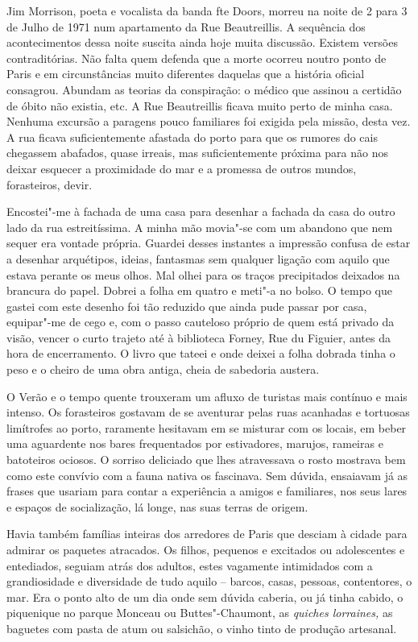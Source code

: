 Jim Morrison, poeta e vocalista da banda fte Doors, morreu na noite de
2 para 3 de Julho de 1971 num apartamento da Rue Beautreillis. A
sequência dos acontecimentos dessa noite suscita ainda hoje muita
discussão. Existem versões contraditórias. Não falta quem defenda que
a morte ocorreu noutro ponto de Paris e em circunstâncias muito
diferentes daquelas que a história oficial consagrou. Abundam as teorias
da conspiração: o médico que assinou a certidão de óbito não existia, etc. A Rue Beautreillis ficava muito perto de minha casa. Nenhuma
excursão a paragens pouco familiares foi exigida pela missão, desta vez.
A rua ficava suficientemente afastada do porto para que os rumores do
cais chegassem abafados, quase irreais, mas suficientemente próxima para
não nos deixar esquecer a proximidade do mar e a promessa de outros
mundos, forasteiros, devir.

Encostei"-me à fachada de uma casa para desenhar a fachada da casa do
outro lado da rua estreitíssima. A minha mão movia"-se com um abandono
que nem sequer era vontade própria. Guardei desses instantes a impressão
confusa de estar a desenhar arquétipos, ideias, fantasmas sem qualquer
ligação com aquilo que estava perante os meus olhos. Mal olhei para os
traços precipitados deixados na brancura do papel. Dobrei a folha em
quatro e meti"-a no bolso. O tempo que gastei com este desenho foi tão
reduzido que ainda pude passar por casa, equipar"-me de cego e, com o
passo cauteloso próprio de quem está privado da visão, vencer o curto
trajeto até à biblioteca Forney, Rue du Figuier, antes da hora de
encerramento. O livro que tateei e onde deixei a folha dobrada tinha o
peso e o cheiro de uma obra antiga, cheia de sabedoria austera.



O Verão e o tempo quente trouxeram um afluxo de turistas mais contínuo
e mais intenso. Os forasteiros gostavam de se aventurar pelas ruas
acanhadas e tortuosas limítrofes ao porto, raramente hesitavam em se
misturar com os locais, em beber uma aguardente nos bares frequentados
por estivadores, marujos, rameiras e batoteiros ociosos. O sorriso
deliciado que lhes atravessava o rosto mostrava bem como este convívio
com a fauna nativa os fascinava. Sem dúvida, ensaiavam já as frases que
usariam para contar a experiência a amigos e familiares, nos seus lares
e espaços de socialização, lá longe, nas suas terras de origem.

Havia também famílias inteiras dos arredores de Paris que desciam à
cidade para admirar os paquetes atracados. Os filhos, pequenos e
excitados ou adolescentes e entediados, seguiam atrás dos adultos, estes
vagamente intimidados com a grandiosidade e diversidade de tudo aquilo
-- barcos, casas, pessoas, contentores, o mar. Era o ponto alto de um
dia onde sem dúvida caberia, ou já tinha cabido, o piquenique no parque
Monceau ou Buttes"-Chaumont, as \emph{quiches lorraines, }as baguetes com
pasta de atum ou salsichão, o vinho tinto de produção artesanal.

